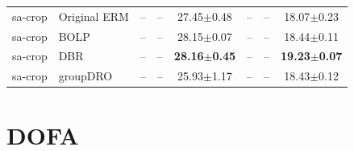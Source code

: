 \documentclass[11pt]{article}
\begin{document}
\begin{table}[h!]
{\begin{tabular}{llcccccc}
sa-crop & Original ERM & -- & -- & 27.45$\pm$0.48 & -- & -- & 18.07$\pm$0.23 \\
sa-crop & BOLP & -- & -- & 28.15$\pm$0.07 & -- & -- & 18.44$\pm$0.11 \\
sa-crop & DBR & -- & -- & \textbf{28.16$\pm$0.45} & -- & -- & \textbf{19.23$\pm$0.07} \\
sa-crop & groupDRO & -- & -- & 25.93$\pm$1.17 & -- & -- & 18.43$\pm$0.12 \\
\bottomrule
\end{tabular}%
}
\end{table}


\clearpage


\section*{DOFA}

\end{document}
